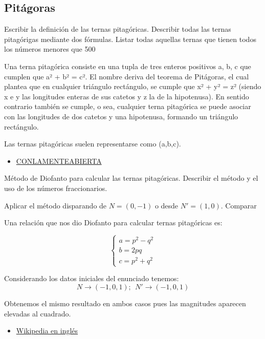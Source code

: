 \subsection{Pitágoras}
\begin{problem}[7]
Escribir la definición de las ternas pitagóricas. Describir todas las ternas pitagórigas mediante dos fórmulas. Listar todas aquellas ternas que tienen todos los números menores que 500

\solution

Una terna pitagórica consiste en una tupla de tres enteros positivos a, b, c que cumplen que a² + b² = c². El nombre deriva del teorema de Pitágoras, el cual plantea que en cualquier triángulo rectángulo, se cumple que x² + y² = z² (siendo x e y las longitudes enteras de sus catetos y z la de la hipotenusa). En sentido contrario también se cumple, o sea, cualquier terna pitagórica se puede asociar con las longitudes de dos catetos y una hipotenusa, formando un triángulo rectángulo.

Las ternas pitagóricas suelen representarse como (a,b,c).



\begin{itemize}
\item \href{https://conlamenteabierta.wordpress.com/2010/02/18/diofanto-y-las-tripletas-pitagoricas/}{CONLAMENTEABIERTA}
\end{itemize}
\end{problem}

\begin{problem}[8]
Método de Diofanto para calcular las ternas pitagóricas. Describir el método y el uso de los números fraccionarios.

Aplicar el método disparando de $N=(0,-1)$ o desde $N'=(1,0)$. Comparar

\solution

Una relación que nos dio Diofanto para calcular ternas pitagóricas es:

\[\left\{ \begin{array}{l} a=p^2-q^2 \\ b=2pq \\ c=p^2+q^2 \end{array} \right.\]

Considerando los datos iniciales del enunciado tenemos:
\[N \to (-1,0,1); \ \ N' \to (-1,0,1)\]

Obtenemos el mismo resultado en ambos casos pues las magnitudes aparecen elevadas al cuadrado.

\begin{itemize}
\item \href{https://en.wikipedia.org/wiki/Diophantus_II.VIII}{Wikipedia en inglés}
\end{itemize}
\end{problem}

